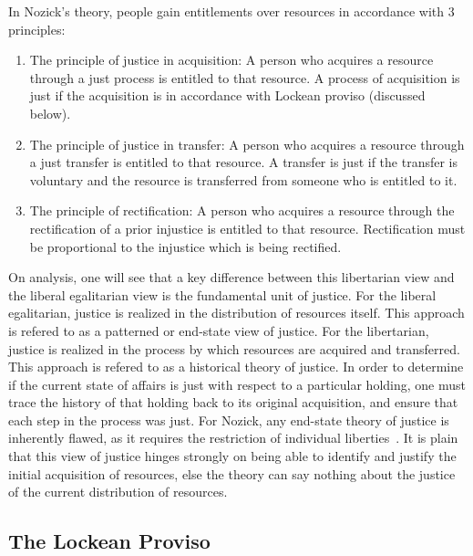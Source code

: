In Nozick's theory, people gain entitlements over resources in accordance with
3 principles:
\begin{enumerate}
    \item The principle of justice in acquisition: A person who acquires a
          resource through a just process is entitled to that resource.
          A process of acquisition is just if the acquisition is in accordance
          with Lockean proviso (discussed below).
    \item The principle of justice in transfer: A person who acquires a resource
          through a just transfer is entitled to that resource. A transfer is 
          just if the transfer is voluntary and the resource is transferred
          from someone who is entitled to it.
    \item The principle of rectification: A person who acquires a resource
          through the rectification of a prior injustice is entitled to that
          resource. Rectification must be proportional to the injustice which
          is being rectified.
\end{enumerate}

On analysis, one will see that a key difference between this libertarian view
and the liberal egalitarian view is the fundamental unit of justice. For the 
liberal egalitarian, justice is realized in the distribution of resources
itself. This approach is refered to as a patterned or end-state view of justice.
For the libertarian, justice is realized in the process by which resources are
acquired and transferred. This approach is refered to as a historical theory of
justice. In order to determine if the current state of affairs is just with 
respect to a particular holding, one must trace the history of that holding
back to its original acquisition, and ensure that each step in the process was
just. For Nozick, any end-state theory of justice is inherently flawed, as it 
requires the restriction of individual liberties~\cite{Henberg_1977}. It is
plain that this view of justice hinges strongly on being able to identify and
justify the initial acquisition of resources, else the theory can say nothing 
about the justice of the current distribution of resources.

\subsection{The Lockean Proviso}

